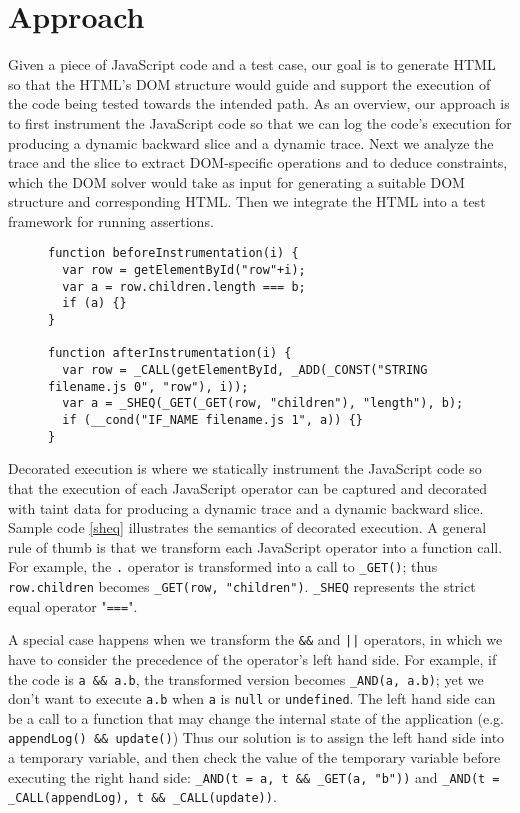 \section{Approach}
Given a piece of JavaScript code and a test case, our goal is to generate HTML so that the HTML's DOM structure would guide and support the execution of the code being tested towards the intended path.  
As an overview, our approach is to first instrument the JavaScript code so that we can log the code's execution for producing a dynamic backward slice and a dynamic trace.  
Next we analyze the trace and the slice to extract DOM-specific operations and to deduce constraints, which the DOM solver would take as input for generating a suitable DOM structure and corresponding HTML.  
Then we integrate the HTML into a test framework for running assertions.  


\begin{figure}
\begin{lstlisting}[caption=Example showing how code is instrumented for dynamic analysis.,label=sheq]  
function beforeInstrumentation(i) {
  var row = getElementById("row"+i);
  var a = row.children.length === b; 
  if (a) {}
}

function afterInstrumentation(i) {
  var row = _CALL(getElementById, _ADD(_CONST("STRING filename.js 0", "row"), i));
  var a = _SHEQ(_GET(_GET(row, "children"), "length"), b);
  if (__cond("IF_NAME filename.js 1", a)) {}
}
\end{lstlisting}
\end{figure}

Decorated execution is where we statically instrument the JavaScript code so that the execution of each JavaScript operator can be captured and decorated with taint data for producing a dynamic trace and a dynamic backward slice.  Sample code \ref{sheq} illustrates the semantics of decorated execution.  
A general rule of thumb is that we transform each JavaScript operator into a function call.  For example, the {\tt .} operator is transformed into a call to {\tt \_GET()}; thus {\tt row.children} becomes {\tt \_GET(row, "children")}.  {\tt \_SHEQ} represents the strict equal operator "{\tt ===}".  

A special case happens when we transform the {\tt \&\&} and {\tt |}{\tt |} operators, in which we have to consider the precedence of the operator's left hand side.   
For example, if the code is {\tt a \&\& a.b}, the transformed version becomes {\tt \_AND(a, a.b)}; yet we don't want to execute {\tt a.b} when {\tt a} is {\tt null} or {\tt undefined}.  
The left hand side can be a call to a function that may change the internal state of the application (e.g. {\tt appendLog() \&\& update()})
Thus our solution is to assign the left hand side into a temporary variable, and then check the value of the temporary variable before executing the right hand side: {\tt \_AND(t = a, t \&\& \_GET(a, "b"))} and {\tt \_AND(t = \_CALL(appendLog), t \&\& \_CALL(update))}.  

